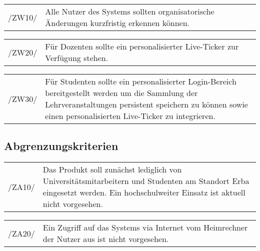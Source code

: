 \begin{tabular}{p{1.5cm}p{14.5cm}}	
	 /ZW10/& Alle Nutzer des Systems sollten organisatorische Änderungen kurzfristig erkennen können. \\[0.25cm]
\end{tabular}

\begin{tabular}{p{1.5cm}p{14.5cm}}	
	 /ZW20/& Für Dozenten sollte ein personalisierter Live-Ticker zur Verfügung stehen. \\[0.25cm]
\end{tabular}

\begin{tabular}{p{1.5cm}p{14.5cm}}	
	 /ZW30/& Für Studenten sollte ein personalisierter Login-Bereich bereitgestellt werden um die Sammlung der Lehrveranstaltungen persistent speichern zu können sowie einen personalisierten Live-Ticker zu integrieren. \\[0.25cm]
\end{tabular}

\subsection{Abgrenzungskriterien}

\begin{tabular}{p{1.5cm}p{14.5cm}}	
	 /ZA10/& Das Produkt soll zunächst lediglich von Universitätsmitarbeitern und Studenten am Standort Erba eingesetzt werden. Ein hochschulweiter Einsatz ist aktuell nicht vorgesehen. \\[0.25cm]
\end{tabular}

\begin{tabular}{p{1.5cm}p{14.5cm}}	
	 /ZA20/& Ein Zugriff auf das Systems via Internet vom Heimrechner der Nutzer aus ist nicht vorgesehen. \\[0.25cm]
\end{tabular}
